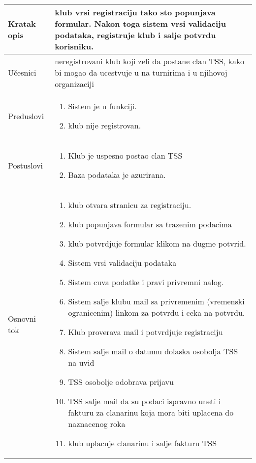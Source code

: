 \documentclass{article}
\begin{document}
\begin{longtable}{| p{} | p{} |} 
\hline
    Kratak opis & klub vrsi registraciju tako sto popunjava formular. Nakon toga sistem vrsi validaciju podataka, registruje klub i salje
potvrdu korisniku.\\ 
\hline    
    Učesnici & 
         neregistrovani klub koji zeli da postane clan TSS, kako bi mogao da ucestvuje u na turnirima i u njihovoj organizaciji
    \\
\hline
   Preduslovi & \begin{enumerate}
       \item Sistem je u funkciji.
       \item klub nije registrovan.
   \end{enumerate}\\
\hline  
    Postuslovi & \begin{enumerate}
        \item Klub je uspesno postao clan TSS
        \item Baza podataka je azurirana.
    \end{enumerate}\\
\hline
    Osnovni tok & \begin{enumerate}
        \item klub otvara stranicu za registraciju.
        \item klub popunjava formular sa trazenim podacima
        \item klub potvrdjuje formular klikom na dugme potvrid.
        \item Sistem vrsi validaciju podataka
        \item Sistem cuva podatke i pravi privremni nalog.
        \item Sistem salje klubu mail sa privremenim (vremenski ogranicenim) linkom za potvrdu i ceka na potvrdu.
        \item Klub proverava mail i potvrdjuje registraciju
        \item Sistem salje mail o datumu dolaska osobolja TSS na uvid
        \item TSS osobolje odobrava prijavu
        \item TSS salje mail da su podaci ispravno uneti i fakturu za clanarinu koja mora biti uplacena do naznacenog roka
        \item klub uplacuje clanarinu i salje fakturu TSS

\end{enumerate}
\end{longtable}
\end{document}

